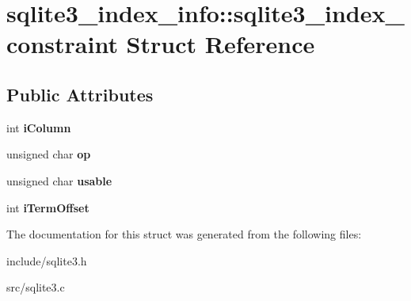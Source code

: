 \hypertarget{structsqlite3__index__info_1_1sqlite3__index__constraint}{\section{sqlite3\-\_\-index\-\_\-info\-:\-:sqlite3\-\_\-index\-\_\-constraint Struct Reference}
\label{structsqlite3__index__info_1_1sqlite3__index__constraint}
}
\subsection*{Public Attributes}
\begin{DoxyCompactItemize}
\item 
\hypertarget{structsqlite3__index__info_1_1sqlite3__index__constraint_a0f1e207060420058ee2881f2ea368e3a}{int {\bfseries i\-Column}}\label{structsqlite3__index__info_1_1sqlite3__index__constraint_a0f1e207060420058ee2881f2ea368e3a}

\item 
\hypertarget{structsqlite3__index__info_1_1sqlite3__index__constraint_a362f4ec1f71975cb0ac39a8b5e4b1476}{unsigned char {\bfseries op}}\label{structsqlite3__index__info_1_1sqlite3__index__constraint_a362f4ec1f71975cb0ac39a8b5e4b1476}

\item 
\hypertarget{structsqlite3__index__info_1_1sqlite3__index__constraint_ae16e62caeab743cc68bb22227dacb501}{unsigned char {\bfseries usable}}\label{structsqlite3__index__info_1_1sqlite3__index__constraint_ae16e62caeab743cc68bb22227dacb501}

\item 
\hypertarget{structsqlite3__index__info_1_1sqlite3__index__constraint_a4e8368da66f34b7f07b369984b813d1b}{int {\bfseries i\-Term\-Offset}}\label{structsqlite3__index__info_1_1sqlite3__index__constraint_a4e8368da66f34b7f07b369984b813d1b}

\end{DoxyCompactItemize}


The documentation for this struct was generated from the following files\-:\begin{DoxyCompactItemize}
\item 
include/sqlite3.\-h\item 
src/sqlite3.\-c\end{DoxyCompactItemize}
